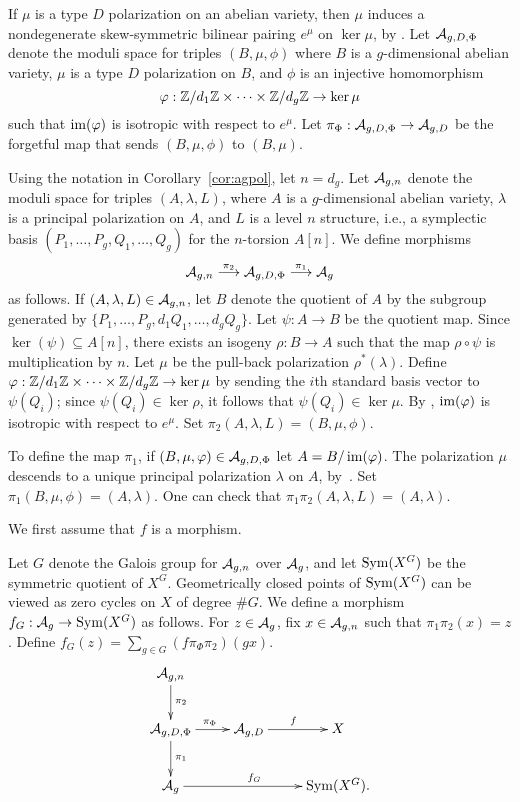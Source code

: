 \documentclass{amsart}
\begin{document}
  If $\mu$ is a type $D$ polarization on an abelian variety, then $\mu$ induces a nondegenerate skew-symmetric bilinear pairing $e^\mu$ on $\ker \mu$, by \cite[Theorem 1]{mumford1966}. Let $\mathcal{A}_{g,{D},\Phi}$ denote the moduli space for triples $(B,\mu,\phi)$ where $B$ is a $g$-dimensional abelian variety, $\mu$ is a type $D$ polarization on $B$, and $\phi$ is an injective homomorphism
  \[
    \varphi: \mathbb{Z}/d_1\mathbb{Z} \times \cdots \times \mathbb{Z}/d_g\mathbb{Z} \to \ker \mu
  \]
  such that $\operatorname{im}(\varphi)$ is isotropic with respect to $e^\mu$.
  Let $\pi_\Phi: \mathcal{A}_{g,{D},\Phi} \to \mathcal{A}_{g,{D}}$ be the forgetful map that sends $(B,\mu,\phi)$ to $(B,\mu)$. %

  Using the notation in Corollary~\ref{cor:agpol}, let $n = d_g$. Let $\mathcal{A}_{g,n}$ denote the moduli space for triples $(A,\lambda,L)$, where $A$ is a $g$-dimensional abelian variety, $\lambda$ is a principal polarization on $A$, and $L$ is a level $n$ structure, i.e., a symplectic basis $(P_1,\ldots,P_g,Q_1,\ldots,Q_g)$ for the $n$-torsion $A[n]$. We define morphisms %
  \[
    \mathcal{A}_{g,n} \stackrel{\pi_2}{\longrightarrow} \mathcal{A}_{g,{D},\Phi} \stackrel{\pi_1}{\longrightarrow} \mathcal{A}_g
  \]
   as follows. If $(A,\lambda,L) \in \mathcal{A}_{g,n}$, let $B$ denote the quotient of $A$ by the subgroup generated by $\{ P_1,\ldots,P_g,d_1Q_1,\ldots,d_gQ_g \}$. Let $\psi: A \to B$ be the quotient map. Since $\ker(\psi) \subseteq A[n]$, there exists an isogeny $\rho: B \to A$ such that the map $\rho \circ \psi$ is multiplication by $n$. Let $\mu$ be the pull-back polarization $\rho^*(\lambda)$. Define $\varphi: \mathbb{Z}/d_1\mathbb{Z} \times \cdots \times \mathbb{Z}/d_g\mathbb{Z} \to \ker \mu$ by sending the $i$th standard basis vector to $\psi(Q_i)$; since $\psi(Q_i) \in \ker \rho$, it follows that $\psi(Q_i) \in \ker \mu$. By \cite[Proposition 1]{mumford1966}, $\operatorname{im}(\varphi)$ is isotropic with respect to $e^\mu$. Set $\pi_2(A,\lambda,L) = (B,\mu,\phi)$.

  To define the map $\pi_1$, if $(B,\mu,\varphi) \in \mathcal{A}_{g,{D},\Phi}$ let $A = B/\operatorname{im}(\varphi)$. The polarization $\mu$ descends to a unique principal polarization $\lambda$ on $A$, by~\cite[Prop.~16.8]{milne-av}. Set $\pi_1(B,\mu,\phi) = (A,\lambda)$.
  One can check that $\pi_1\pi_2(A,\lambda,L) = (A,\lambda)$.

  We first assume that $f$ is a morphism.

  Let $G$ denote the Galois group for $\mathcal{A}_{g,n}$ over $\mathcal{A}_g$, and let $\mathrm{Sym}(X^G)$ be the symmetric quotient of $X^G$. Geometrically closed points of $\mathrm{Sym}(X^G)$ can be viewed as zero cycles on $X$ of degree $\# G$. We define a morphism $f_G: \mathcal{A}_g \to \mathrm{Sym}(X^G)$ as follows. For $z \in \mathcal{A}_g$, fix $x \in \mathcal{A}_{g,n}$ such that $\pi_1\pi_2(x) = z$. Define $f_G(z) = \sum_{g \in G} (f\pi_\Phi\pi_2)(gx)$.
  \[
    \xymatrix{
      \agn \ar[d]^{\pi_2} & & \\
      \agphi \ar[d]^{\pi_1} \ar[r]^{\pi_\Phi} & \agd \ar[r]^f & X \\
      \ag \ar[rr]^{f_G} & &\simg.
      }
  \]
\end{document}
